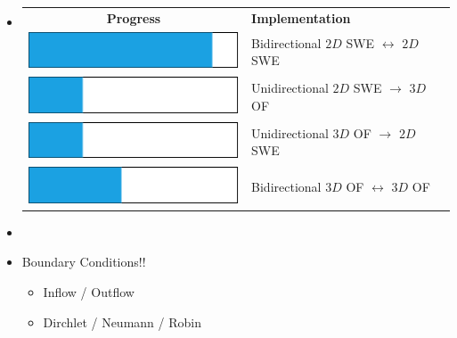 

\begin{frame}
\begin{multicols}{2}
\begin{itemize}
\item<1->[]
{\renewcommand{\arraystretch}{2.5} %
\begin{table}[]
\begin{tabular}{ cl }
{\large\textbf{Progress}} & {\large\hspace{5pt} \textbf{Implementation}}\\
\includegraphics[scale=0.5]{./Resources/Images/bar1.png} & \hspace{5pt}Bidirectional $2D$ SWE $\leftrightarrow$ $2D$ SWE  \\ 
\includegraphics[scale=0.5]{./Resources/Images/bar2.png} &\hspace{5pt} Unidirectional $2D$ SWE $\rightarrow$ $3D$ OF \\ 
\includegraphics[scale=0.5]{./Resources/Images/bar2.png} &\hspace{5pt} Unidirectional $3D$ OF $\rightarrow$ $2D$ SWE \\ 
\includegraphics[scale=0.5]{./Resources/Images/bar3.png} & \hspace{5pt} Bidirectional $3D$ OF $\leftrightarrow$ $3D$ OF \\
\end{tabular}

\end{table}
}

\vfill\columnbreak

\item<2->[] \\[2.5cm]
\item<3->[] {\Large\hspace{0.23\columnwidth}Boundary Conditions!!}
\begin{itemize}
 \setlength{\itemindent}{3.5cm}
\vspace{0.5cm}
\item<4-> Inflow / Outflow 
\item<4-> Dirchlet / Neumann / Robin
\end{itemize}
\end{itemize}
\end{multicols}
\end{frame}

